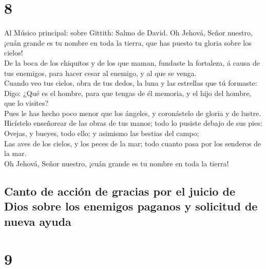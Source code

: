 \hypertarget{section-7}{%
\section{8}\label{section-7}}

 Al Músico principal: sobre Gittith: Salmo de David. Oh
Jehová, Señor nuestro, ¡cuán grande es tu nombre en toda la tierra, que
has puesto tu gloria sobre los cielos!\\
 De la boca de los chiquitos y de los que maman, fundaste
la fortaleza, á causa de tus enemigos, para hacer cesar al enemigo, y al
que se venga.\\
 Cuando veo tus cielos, obra de tus dedos, la luna y las
estrellas que tú formaste:\\
 Digo: ¿Qué es el hombre, para que tengas de él memoria, y
el hijo del hombre, que lo visites?\\
 Pues le has hecho poco menor que los ángeles, y
coronástelo de gloria y de lustre.\\
 Hicístelo enseñorear de las obras de tus manos; todo lo
pusiste debajo de sus pies:\\
 Ovejas, y bueyes, todo ello; y asimismo las bestias del
campo;\\
 Las aves de los cielos, y los peces de la mar; todo
cuanto pasa por los senderos de la mar.\\
 Oh Jehová, Señor nuestro, ¡cuán grande es tu nombre en
toda la tierra!

\hypertarget{canto-de-acciuxf3n-de-gracias-por-el-juicio-de-dios-sobre-los-enemigos-paganos-y-solicitud-de-nueva-ayuda}{%
\subsection{Canto de acción de gracias por el juicio de Dios sobre los
enemigos paganos y solicitud de nueva
ayuda}\label{canto-de-acciuxf3n-de-gracias-por-el-juicio-de-dios-sobre-los-enemigos-paganos-y-solicitud-de-nueva-ayuda}}

\hypertarget{section-8}{%
\section{9}\label{section-8}}

